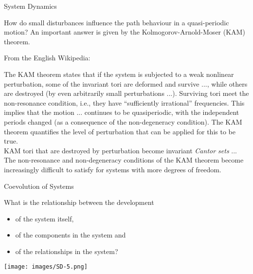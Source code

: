 \documentclass{beamer}
\begin{document}
\begin{frame}{System Dynamics}

How do small disturbances influence the path behaviour in a quasi-periodic
motion? An important answer is given by the Kolmogorov-Arnold-Moser (KAM)
theorem.

From the English Wikipedia: \footnotesize

The KAM theorem states that if the system is subjected to a weak nonlinear
perturbation, some of the invariant tori are deformed and survive ..., while
others are destroyed (by even arbitrarily small perturbations ...).  Surviving
tori meet the non-resonance condition, i.e., they have “sufficiently
irrational” frequencies. This implies that the motion ... continues to be
quasiperiodic, with the independent periods changed (as a consequence of the
non-degeneracy condition). The KAM theorem quantifies the level of
perturbation that can be applied for this to be true.\\[.3em]
KAM tori that are destroyed by perturbation become invariant \emph{Cantor
  sets} ...\\[.3em]
The non-resonance and non-degeneracy conditions of the KAM theorem become
increasingly difficult to satisfy for systems with more degrees of freedom.

\end{frame}

\begin{frame}{Coevolution of Systems}
\begin{minipage}{.55\textwidth}
  What is the relationship between the development
  \begin{itemize}
  \item of the system itself,
  \item of the components in the system and
  \item of the relationships in the system?
  \end{itemize}
\end{minipage}\hfill 
\begin{minipage}{.4\textwidth}
    \begin{center}
      \texttt{[image: images/SD-5.png]}
    \end{center}
  \end{minipage}
\end{frame}

\end{document}
